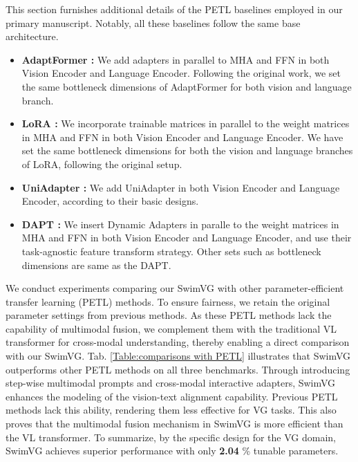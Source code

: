 This section furnishes additional details of the PETL baselines employed in our primary manuscript. Notably, all these baselines follow the same base architecture.
\begin{itemize}

    \item \textbf{AdaptFormer \cite{chen2022adaptformer}:} We add adapters in parallel to MHA and FFN in both Vision Encoder and Language Encoder. Following the original work, we set the same bottleneck dimensions of AdaptFormer for both vision and language branch.
    
    \item \textbf{LoRA \cite{hu2021lora}:} We incorporate trainable matrices in parallel to the weight matrices in MHA and FFN in both Vision Encoder and Language Encoder. 
    We have set the same bottleneck dimensions for both the vision and language branches of LoRA, following the original setup.

    \item \textbf{UniAdapter \cite{lu2024uniadapter}:} We add UniAdapter  in both Vision Encoder and Language Encoder, according to their basic designs. 

    \item \textbf{DAPT \cite{zhou2024dynamic}:} We insert Dynamic Adapters in paralle to the weight matrices in MHA and FFN in both Vision Encoder and Language Encoder, and use their task-agnostic feature transform strategy. Other sets such as bottleneck dimensions are same as the DAPT.

   

    
\end{itemize}

We conduct experiments comparing our SwimVG with other parameter-efficient transfer learning (PETL) methods. To ensure fairness, we retain the original parameter settings from previous methods. As these PETL methods lack the capability of multimodal fusion, we complement them with the traditional VL transformer for cross-modal understanding, thereby enabling a direct comparison with our SwimVG. Tab. \ref{Table:comparisons with PETL} illustrates that SwimVG outperforms other PETL methods on all three benchmarks. Through introducing step-wise multimodal prompts and cross-modal interactive adapters, SwimVG enhances the modeling of the vision-text alignment capability. Previous PETL methods lack this ability, rendering them less effective for VG tasks. This also proves that the multimodal fusion mechanism in SwimVG is more efficient than the VL transformer. To summarize, by the specific design for the VG domain, SwimVG achieves superior performance with only \textbf{2.04} \% tunable parameters.

